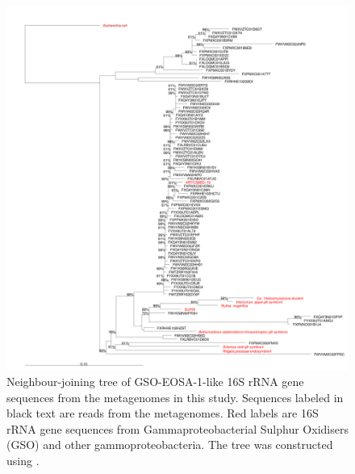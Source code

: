 \begin{figure}
  \centering
  \includegraphics[width=\textwidth]{../polarfront/GSO-EOSA-1tree.png}
  \caption[Tree of GSO-EOSA-1 related 16S rRNA genes]{
  Neighbour-joining tree of GSO-EOSA-1-like 16S rRNA gene sequences from the metagenomes in this study.
  Sequences labeled in black text are reads from the metagenomes.
  Red labels are 16S rRNA gene sequences from Gammaproteobacterial Sulphur Oxidisers (GSO) and other gammoproteobacteria.
  The tree was constructed using  \cite{Ludwig:2004dg}.
  }
  \label{fig:GSO-EOSA-1tree}
\end{figure}
